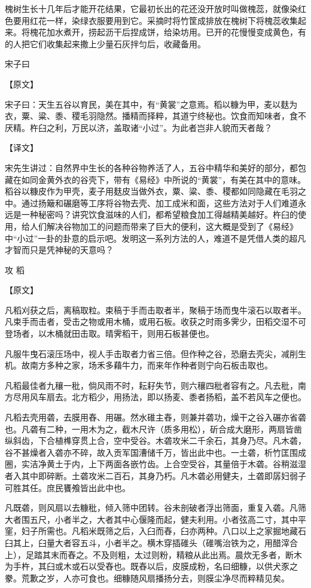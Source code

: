 \documentclass[12pt,UTF8]{ctexbook}
\begin{document}
槐树生长十几年后才能开花结果，它最初长出的花还没开放时叫做槐蕊，就像染红色要用红花一样，染绿衣服要用到它。采摘时将竹筐成排放在槐树下将槐蕊收集起来。将槐花加水煮开，捞起沥干后捏成饼，给染坊用。已开的花慢慢变成黄色，有的人把它们收集起来撒上少量石灰拌匀后，收藏备用。

宋子曰

【原文】

宋子曰：天生五谷以育民，美在其中，有“黄裳”之意焉。稻以糠为甲，麦以麸为衣，粟、粱、黍、稷毛羽隐然。播精而择粹，其道宁终秘也。饮食而知味者，食不厌精。杵臼之利，万民以济，盖取诸“小过”。为此者岂非人貌而天者哉？

【译文】

宋先生讲过：自然界中生长的各种谷物养活了人，五谷中精华和美好的部分，都包藏在如同金黄外衣的谷壳下，带有《易经》中所说的“黄裳”，有美在其中的意味。稻谷以糠皮作为甲壳，麦子用麸皮当做外衣，粟、粱、黍、稷都如同隐藏在毛羽之中。通过扬簸和碾磨等工序将谷物去壳、加工成米和面，这些方法对于人们难道永远是一种秘密吗？讲究饮食滋味的人们，都希望粮食加工得越精美越好。杵臼的使用，给人们解决谷物加工的问题而带来了巨大的便利，这大概是受到了《易经》中“小过”一卦的卦意的启示吧。发明这一系列方法的人，难道不是凭借人类的超凡才智而只是凭神秘的天意吗？

攻 稻

【原文】

凡稻刈获之后，离稿取粒。束稿于手而击取者半，聚稿于场而曳牛滚石以取者半。凡束手而击者，受击之物或用木桶，或用石板。收获之时雨多霁少，田稻交湿不可登场者，以木桶就田击取。晴霁稻干，则用石板甚便也。

凡服牛曳石滚压场中，视人手击取者力省三倍。但作种之谷，恐磨去壳尖，减削生机。故南方多种之家，场禾多藉牛力，而来年作种者则宁向石板击取也。

凡稻最佳者九穰一秕，倘风雨不时，耘耔失节，则六穰四秕者容有之。凡去秕，南方尽用风车扇去。北方稻少，用扬法，即以扬麦、黍者扬稻，盖不若风车之便也。

凡稻去壳用砻，去膜用舂、用碾。然水碓主舂，则兼并砻功，燥干之谷入碾亦省砻也。凡砻有二种，一用木为之，截木尺许（质多用松），斫合成大磨形，两扇皆凿纵斜齿，下合植榫穿贯上合，空中受谷。木砻攻米二千余石，其身乃尽。凡木砻，谷不甚燥者入砻亦不碎，故入贡军国漕储千万，皆出此中也。一土砻，析竹匡围成圈，实洁净黄土于内，上下两面各嵌竹齿。上合空受谷，其量倍于木砻。谷稍滋湿者入其中即碎断。土砻攻米二百石，其身乃朽。凡木砻必用健夫，土砻即孱妇弱子可胜其任。庶民饔飧皆出此中也。

凡既砻，则风扇以去糠秕，倾入筛中团转。谷未剖破者浮出筛面，重复入砻。凡筛大者围五尺，小者半之，大者其中心偃隆而起，健夫利用。小者弦高二寸，其中平窐，妇子所需也。凡稻米既筛之后，入臼而舂，臼亦两种。八口以上之家掘地藏石臼其上，臼量大者容五斗，小者半之。横木穿插碓头（碓嘴治铁为之，用醋滓合上），足踏其末而舂之。不及则粗，太过则粉，精粮从此出焉。晨炊无多者，断木为手杵，其臼或木或石以受舂也。既舂以后，皮膜成粉，名曰细糠，以供犬豕之豢。荒歉之岁，人亦可食也。细糠随风扇播扬分去，则膜尘净尽而粹精见矣。
\end{document}
